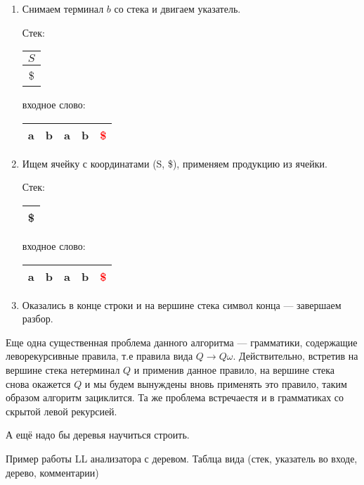 \begin{example}
\begin{enumerate}
\item Снимаем терминал $b$ со стека и двигаем указатель.

    Стек: \,
    \begin{tabular}[c]{ |c| } 
        \\ \hline
        $S$ \\ \hline
        \$ \\ \hline
    \end{tabular}  
    \qquad  \qquad \qquad  \qquad входное слово: \,
    \begin{tabular}[c]{ |c|c|c|c|c| } 
        \hline
        a & b & a & b & \textcolor{red}{\$} \\ \hline
    \end{tabular}

\item Ищем ячейку с координатами (S, \$), применяем продукцию из ячейки.

    Стек: \,
    \begin{tabular}[c]{ |c| } 
        \\ \hline
        \$ \\ \hline
    \end{tabular}  
    \qquad  \qquad \qquad  \qquad входное слово: \,
    \begin{tabular}[c]{ |c|c|c|c|c| } 
        \hline
        a & b & a & b & \textcolor{red}{\$} \\ \hline
    \end{tabular}    
 
\item Оказались в конце строки и на вершине стека символ конца --- завершаем разбор.

\end{enumerate}

\end{example}

Еще одна существенная проблема данного алгоритма --- грамматики, содержащие леворекурсивные правила, т.е правила вида $Q \rightarrow Q\omega$. Действительно, встретив на вершине стека нетерминал $Q$  и применив данное правило, на вершине стека снова окажется $Q$ и мы будем вынуждены вновь применять это правило, таким образом алгоритм зациклится. Та же проблема встречаестя и в грамматиках со скрытой левой рекурсией.

А ещё надо бы деревья научиться строить.

\begin{example}Пример работы LL анализатора с деревом.
  Таблца вида (стек, указатель во входе, дерево, комментарии)
\end{example}

